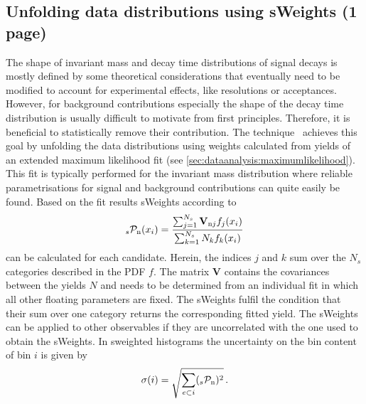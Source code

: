 
\subsection{Unfolding data distributions using sWeights (1 page)}
\label{sec:dataanalysis:selection:splot}

The shape of invariant mass and decay time distributions of signal decays is
mostly defined by some theoretical considerations that eventually need to be
modified to account for experimental effects, like resolutions or acceptances.
However, for background contributions especially the shape of the decay time
distribution is usually difficult to motivate from first principles.
Therefore, it is beneficial to statistically remove their contribution. The
\sPlot technique~\cite{Pivk:2004ty} achieves this goal by unfolding the data
distributions using weights calculated from yields of an extended maximum
likelihood fit (see \cref{sec:dataanalysis:maximumlikelihood}). This fit is
typically performed for the invariant mass distribution where reliable
parametrisations for signal and background contributions can quite easily be
found. Based on the fit results sWeights according to
\begin{align}
	_{s}\mathcal{P}_\text{n}(x_i) = \frac{\sum_{j = 1}^{N_s}\textbf{V}_{\text{n}j}f_j(x_i)}{\sum_{k = 1}^{N_s} N_k f_k(x_i)}
\label{eq:dataanalysis:selection:splot:weightdefinition}
\end{align}
can be calculated for each candidate. Herein, the indices $j$ and $k$ sum over
the $N_s$ categories described in the PDF $f$. The matrix \textbf{V} contains
the covariances between the yields $N$ and needs to be determined from an
individual fit in which all other floating parameters are fixed. The sWeights
fulfil the condition that their sum over one category returns the
corresponding fitted yield. The sWeights can be applied to other observables
if they are uncorrelated with the one used to obtain the sWeights. In
sweighted histograms the uncertainty on the bin content of bin $i$ is given by
\begin{align}
	\sigma(i) = \sqrt{\sum_{e \subset i} (_{s}\mathcal{P}_\text{n})^2}\,.
\label{eq:dataanalysis:selection:splot:weighterror}
\end{align}